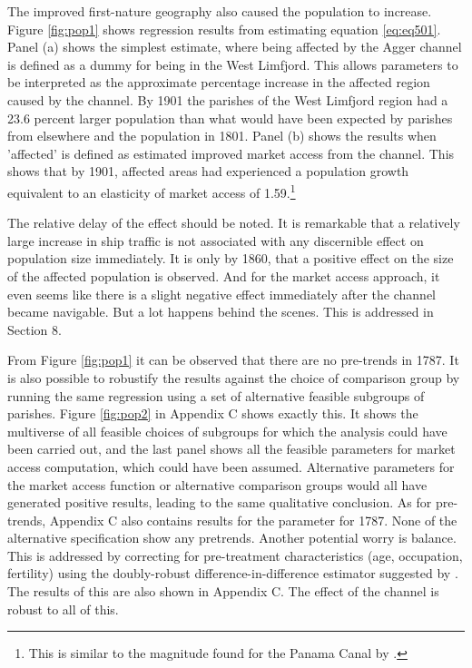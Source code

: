 \documentclass[11pt]{article}
\begin{document}
The improved first-nature geography also caused the population to increase. Figure \ref{fig:pop1} shows regression results from estimating equation \ref{eq:eq501}. Panel (a) shows the simplest estimate, where being affected by the Agger channel is defined as a dummy for being in the West Limfjord. This allows parameters to be interpreted as the approximate percentage increase in the affected region caused by the channel. By 1901 the parishes of the West Limfjord region had a 23.6 percent larger population than what would have been expected by parishes from elsewhere and the population in 1801. Panel (b) shows the results when 'affected' is defined as estimated improved market access from the channel. This shows that by 1901, affected areas had experienced a population growth equivalent to an elasticity of market access of 1.59.\footnote{This is similar to the magnitude found for the Panama Canal by \cite{rauch2022a}.}

The relative delay of the effect should be noted. It is remarkable that a relatively large increase in ship traffic is not associated with any discernible effect on population size immediately. It is only by 1860, that a positive effect on the size of the affected population is observed. And for the market access approach, it even seems like there is a slight negative effect immediately after the channel became navigable. But a lot happens behind the scenes. This is addressed in Section 8. 

From Figure \ref{fig:pop1} it can be observed that there are no pre-trends in 1787. It is also possible to robustify the results against the choice of comparison group by running the same regression using a set of alternative feasible subgroups of parishes. Figure \ref{fig:pop2} in Appendix C shows exactly this. It shows the multiverse of all feasible choices of subgroups \citep{Steegen2016multiverse} for which the analysis could have been carried out, and the last panel shows all the feasible parameters for market access computation, which could have been assumed. Alternative parameters for the market access function or alternative comparison groups would all have generated positive results, leading to the same qualitative conclusion. As for pre-trends, Appendix C also contains results for the parameter for 1787. None of the alternative specification show any pretrends. Another potential worry is balance. This is addressed by correcting for pre-treatment characteristics (age, occupation, fertility) using the doubly-robust difference-in-difference estimator suggested by \cite{Callaway2021did}. The results of this are also shown in Appendix C. The effect of the channel is robust to all of this.
\end{document}
